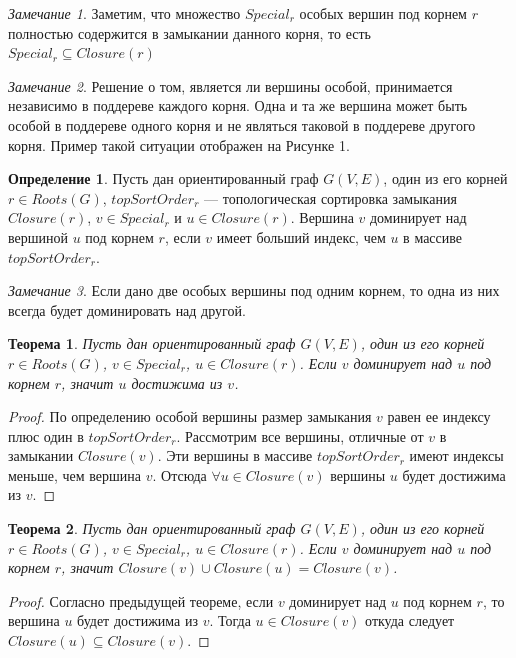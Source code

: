 \documentclass[12pt,a4paper,oneside]{article}
\newtheorem{theorem}{Теорема}
\theoremstyle{definition}
\newtheorem{definition}{Определение}[]
\theoremstyle{lemma}
\theoremstyle{remark}
\newtheorem{remark}{Замечание}[]
\begin{document}
\begin{remark}
Заметим, что множество $Special_r$ особых вершин под корнем $r$ полностью содержится в замыкании данного корня, то есть $Special_r \subseteq Closure(r)$
\end{remark}

\begin{remark}
Решение о том, является ли вершины особой, принимается независимо в поддереве каждого корня. Одна и та же вершина может быть особой в поддереве одного корня и не являться таковой в поддереве другого корня. Пример такой ситуации отображен на Рисунке 1.
\end{remark}

\begin{definition}
Пусть дан ориентированный граф $G(V,E)$, один из его корней $r \in Roots(G)$, $topSortOrder_r$ --- топологическая сортировка замыкания $Closure(r)$, $v \in Special_r$ и $u \in Closure(r)$. Вершина $v$ доминирует над вершиной $u$ под корнем $r$, если $v$ имеет больший индекс, чем $u$ в массиве $topSortOrder_r$.
\end{definition}

\begin{remark}
Если дано две особых вершины под одним корнем, то одна из них всегда будет доминировать над другой.
\end{remark}

\begin{theorem}
Пусть дан ориентированный граф $G(V,E)$, один из его корней $r \in Roots(G)$, $v \in Special_r$, $u \in Closure(r)$. Если $v$ доминирует над $u$ под корнем $r$, значит $u$ достижима из $v$.
\end{theorem}

\begin{proof}
По определению особой вершины размер замыкания $v$ равен ее индексу плюс один в $topSortOrder_r$. Рассмотрим все вершины, отличные от $v$ в замыкании $Closure(v)$. Эти вершины в массиве $topSortOrder_r$ имеют индексы меньше, чем вершина $v$. Отсюда $\forall u \in Closure(v)$ вершины $u$ будет достижима из $v$.
\end{proof}

\begin{theorem}
Пусть дан ориентированный граф $G(V,E)$, один из его корней $r \in Roots(G)$, $v \in Special_r$, $u \in Closure(r)$. Если $v$ доминирует над $u$ под корнем $r$, значит $Closure(v) \cup Closure(u) = Closure(v)$.
\end{theorem}

\begin{proof}
Согласно предыдущей теореме, если $v$ доминирует над $u$ под корнем $r$, то вершина $u$ будет достижима из $v$. Тогда $u \in Closure(v)$ откуда следует $Closure(u) \subseteq Closure(v)$.
\end{proof}
\end{document}
